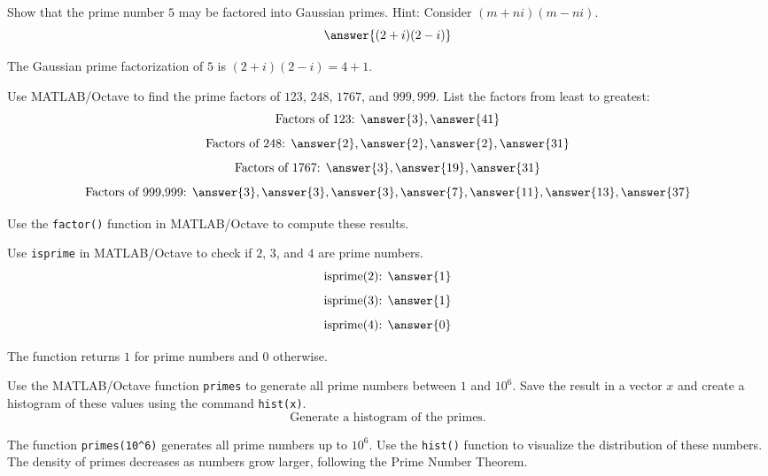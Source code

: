 \documentclass{ximera}
\author{Jont Allen}
\begin{document}
\begin{problem}
    Show that the prime number \(5\) may be factored into Gaussian primes. Hint: Consider \((m + ni)(m - ni)\).
    \[
    \answer{(2 + i)(2 - i)}
    \]
    \begin{feedback}[correct]
    The Gaussian prime factorization of \(5\) is \((2 + i)(2 - i) = 4 + 1\).
    \end{feedback}
\end{problem}

\begin{problem}
    Use MATLAB/Octave to find the prime factors of \(123\), \(248\), \(1767\), and \(999,999\). List the factors from least to greatest:
    \[
    \text{Factors of 123: } \answer{3}, \answer{41}
    \]
    \[
    \text{Factors of 248: } \answer{2}, \answer{2}, \answer{2}, \answer{31}
    \]
    \[
    \text{Factors of 1767: } \answer{3}, \answer{19}, \answer{31}
    \]
    \[
    \text{Factors of 999,999: } \answer{3}, \answer{3}, \answer{3}, \answer{7}, \answer{11}, \answer{13}, \answer{37}
    \]
    \begin{feedback}[correct]
    Use the \texttt{factor()} function in MATLAB/Octave to compute these results.
    \end{feedback}
\end{problem}

\begin{problem}
    Use \texttt{isprime} in MATLAB/Octave to check if \(2\), \(3\), and \(4\) are prime numbers.
    \[
    \text{isprime(2): } \answer{1}
    \]
    \[
    \text{isprime(3): } \answer{1}
    \]
    \[
    \text{isprime(4): } \answer{0}
    \]
    \begin{feedback}[correct]
    The function returns \(1\) for prime numbers and \(0\) otherwise.
    \end{feedback}
\end{problem}

\begin{problem}
    Use the MATLAB/Octave function \texttt{primes} to generate all prime numbers between \(1\) and \(10^6\).
    Save the result in a vector \(x\) and create a histogram of these values using the command \texttt{hist(x)}.
    \[
    \text{Generate a histogram of the primes.}
    \]
    \begin{feedback}[correct]
    The function \texttt{primes(10^6)} generates all prime numbers up to \(10^6\). Use the \texttt{hist()} function to visualize the distribution of these numbers. The density of primes decreases as numbers grow larger, following the Prime Number Theorem.
    \end{feedback}
\end{problem}
\end{document}
